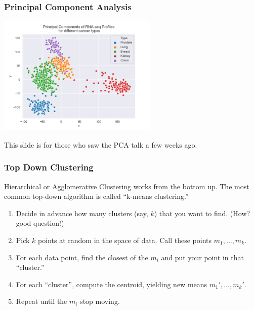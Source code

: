 \documentclass[colorlinks=true,linkcolor=blue]{beamer}
\begin{document}
\begin{frame}
  \frametitle{Principal Component Analysis}
\begin{center}
  \includegraphics[width=3in]{../png/cluster.png}
\end{center}
This slide is for those who saw the PCA talk a few weeks ago.  
\end{frame}
\begin{frame}
  \frametitle{Top Down Clustering}
  Hierarchical or Agglomerative Clustering works from the bottom up. The most common top-down algorithm is called ``k-means clustering.''
  \begin{enumerate}
  \item Decide in advance how many clusters (say, $k$) that you want to find. (How? good question!)
  \item Pick $k$ points at random in the space of data. Call these points $m_1, \ldots, m_k$. 
  \item For each data point, find the closest of the $m_i$ and put your point in that ``cluster.''
  \item For each ``cluster'', compute the centroid, yielding new means $m_1', \ldots, m_k'$.
  \item Repeat until the $m_i$ stop moving.
  \end{enumerate}
\end{frame}
\end{document}
